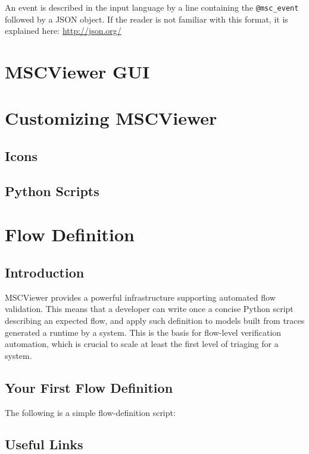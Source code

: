 \documentclass[11pt, twoside, titlepage]{book}
\newcommand{\prog}{MSCViewer}
\begin{document}
An event is described in the input language by a line containing the
\texttt{@msc\_event} followed by a JSON object. If the reader is not familiar
with this format, it is explained here: \href{http://json.org/}{http://json.org/}
   
\chapter{\prog{}  GUI}

\chapter{Customizing \prog}
\section{Icons}
\section{Python Scripts}

\chapter{Flow Definition}
\section{Introduction}
\prog{} provides a powerful infrastructure supporting automated flow validation.
This means that a developer can write once a concise Python script describing an expected flow,
and apply such definition to models built from traces generated a runtime by a system. This
is the basis for flow-level verification automation, which is crucial to scale at least the first
level of triaging for a system.

\section{Your First Flow Definition}
The following is a simple flow-definition script:


\appendix
\section{Useful Links}
\begin{tabular}{l l p{9.0cm}}

\end{tabular}
 
\printindex
\end{document}
